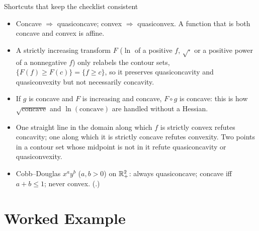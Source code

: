 \begin{rulebox}{Shortcuts that keep the checklist consistent}
\begin{itemize}[leftmargin=1.6em,itemsep=0.3ex]
  \item Concave $\Rightarrow$ quasiconcave; convex $\Rightarrow$
        quasiconvex. A function that is both concave and convex is affine.
  \item A strictly increasing transform $F$ ($\ln$ of a positive $f$,
        $\sqrt{\cdot}$ or a positive power of a nonnegative $f$) only
        relabels the contour sets, $\{F(f)\ge F(c)\}=\{f\ge c\}$, so it
        preserves quasiconcavity and quasiconvexity but not necessarily
        concavity.
  \item If $g$ is concave and $F$ is increasing and concave, $F\circ g$ is
        concave: this is how $\sqrt{\text{concave}}$ and
        $\ln(\text{concave})$ are handled without a Hessian.
  \item One straight line in the domain along which $f$ is strictly convex
        refutes concavity; one along which it is strictly concave refutes
        convexity. Two points in a contour set whose midpoint is not in it
        refute quasiconcavity or quasiconvexity.
  \item Cobb--Douglas $x^{a}y^{b}$ ($a,b>0$) on $\mathbb{R}^{2}_{+}$: always
        quasiconcave; concave iff $a+b\le1$; never convex.
        (.)
\end{itemize}
\end{rulebox}

\section{Worked Example}

